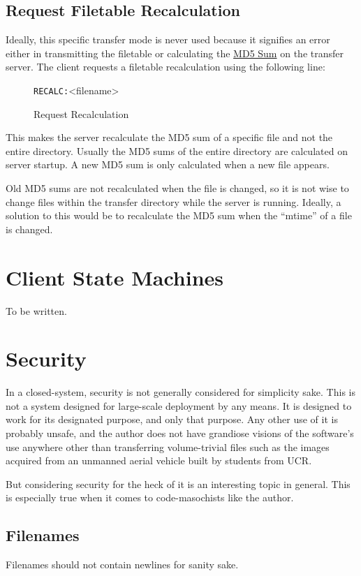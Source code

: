 \documentclass[12pt]{article}
\begin{document}
\subsection{Request Filetable Recalculation}
\label{sec:recalculate_MD5}
Ideally, this specific transfer mode is never used because it signifies an
error either in transmitting the filetable or calculating the
\href{http://en.wikipedia.org/wiki/Md5sum}{MD5 Sum} on the transfer server.
The client requests a filetable recalculation using the following line:
\begin{figure}[H]
	\centering
	\verb+RECALC:+\textvisiblespace <filename>\carriagereturn\carriagereturn
	\caption{Request Recalculation}
	\label{fig:recalculate_request}
\end{figure}

This makes the server recalculate the MD5 sum of a specific file and not the
entire directory.  Usually the MD5 sums of the entire directory are calculated
on server startup.  A new MD5 sum is only calculated when a new file appears.

Old MD5 sums are not recalculated when the file is changed, so it is not wise
to change files within the transfer directory while the server is running.
Ideally, a solution to this would be to recalculate the MD5 sum when the
``mtime'' of a file is changed.

\section{Client State Machines}
To be written.

\section{Security}
\label{sec:security}
In a closed-system, security is not generally considered for simplicity sake.
This is not a system designed for large-scale deployment by any means.
It is designed to work for its designated purpose, and only that purpose.
Any other use of it is probably unsafe, and the author does not have grandiose
visions of the software's use anywhere other than transferring volume-trivial
files such as the images acquired from an unmanned aerial vehicle built by
students from UCR.

But considering security for the heck of it is an interesting topic in general.
This is especially true when it comes to code-masochists like the author.

\subsection{Filenames}
\label{sec:filenames}
Filenames should not contain newlines for sanity sake.
\end{document}
